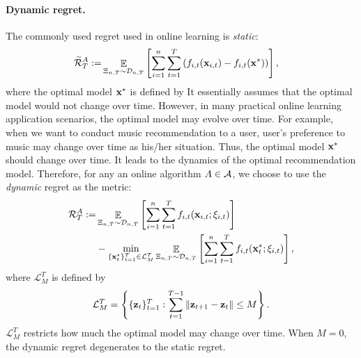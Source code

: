 \documentclass{article}
\def\rc{\color {red}}
\begin{document}
\paragraph{Dynamic regret.} The commonly used regret used in online learning is \emph{static}:
\begin{align}
\label{equa_definition_our_regret}
\widetilde{{\mathcal{R}}}_T^{A} := & \mathop{\mathbb{E}}_{ \Xi_{n,T} \sim \mathcal{D}_{n,T} }  \left[\sum_{i=1}^n\sum_{t=1}^T \left( f_{i,t}({\bf x}_{i,t}) - f_{i,t}({\bf x}^\ast) \right) \right],
\end{align} where the optimal model ${\bf x}^\ast$ is defined by
%
%
It essentially assumes that the optimal model would not change over time. However, in many practical online learning application scenarios, the optimal model may evolve over time. For example, when we want to conduct music recommendation to a user, user's preference to music may change over time as his/her situation.  Thus, the optimal model ${\bf x}^\ast$ should change over time. It leads to the dynamics of the optimal recommendation model. Therefore, for any an online algorithm $A\in{\mathcal{A}}$, we choose to use the \emph{dynamic} regret as the metric:
\begin{align}
\nonumber
{\mathcal{R}}_T^{A} := & \mathop{\mathbb{E}}_{ \Xi_{n,T} \sim \mathcal{D}_{n,T} }  \left[\sum_{i=1}^n\sum_{t=1}^T f_{i,t}({\bf x}_{i,t};\xi_{i,t}) \right]
\\ \label{equa_definition_our_regret}
& - \min_{\{{\bf x}_t^\star\}_{t=1}^T \in \mathcal{L}_{M}^T}\mathop{\mathbb{E}}_{ \Xi_{n,T} \sim \mathcal{D}_{n,T} }  \left[\sum_{i=1}^n\sum_{t=1}^T f_{i,t}({\bf x}_t^\ast;\xi_{i,t}) \right],
\end{align}
where $\mathcal{L}_M^T$ is defined by
\begin{align}
\nonumber
{\mathcal{L}}_{M}^T = \left\{\{{\bf z}_t\}_{t=1}^T : \sum\limits_{t=1}^{T-1}\|{\bf z}_{t+1}-{\bf z}_t\|\le M \right\}.
\end{align} $\mathcal{L}_M^T$ restricts how much the optimal model may change over time. When $M=0$, the dynamic regret degenerates to the static regret.
\end{document}
